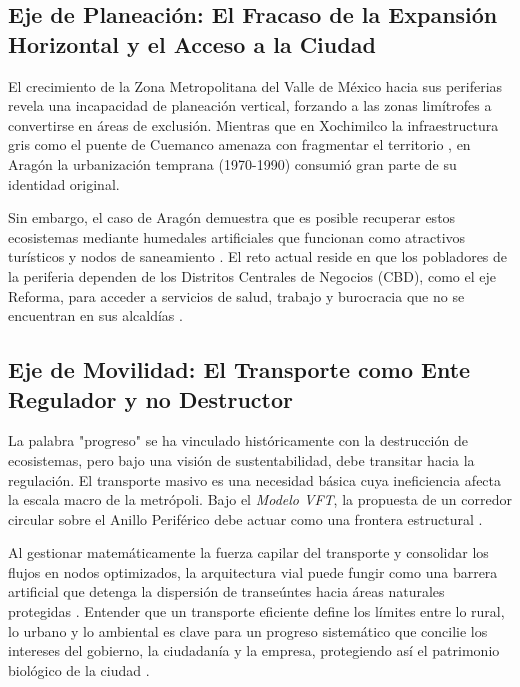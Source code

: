 \subsection{Eje de Planeación: El Fracaso de la Expansión Horizontal y el Acceso a la Ciudad}

El crecimiento de la Zona Metropolitana del Valle de México hacia sus periferias revela una incapacidad de planeación vertical, 
forzando a las zonas limítrofes a convertirse en áreas de exclusión. Mientras que en Xochimilco la infraestructura gris como el puente de 
Cuemanco amenaza con fragmentar el territorio \cite{segob2020proposicion}, en Aragón la urbanización temprana (1970-1990) consumió gran parte de su identidad original. 

Sin embargo, el caso de Aragón demuestra que es posible recuperar estos ecosistemas mediante humedales artificiales que funcionan como atractivos turísticos 
y nodos de saneamiento \cite{unam2020aragon, sedema2022programa}. El reto actual reside en que los pobladores de la periferia dependen de los Distritos Centrales 
de Negocios (CBD), como el eje Reforma, para acceder a servicios de salud, trabajo y burocracia que no se encuentran en sus alcaldías \cite{rojas2020deterioro}.

\subsection{Eje de Movilidad: El Transporte como Ente Regulador y no Destructor}

La palabra "progreso" se ha vinculado históricamente con la destrucción de ecosistemas, pero bajo una visión de sustentabilidad, 
debe transitar hacia la regulación. El transporte masivo es una necesidad básica cuya ineficiencia afecta la escala macro de la metrópoli. 
Bajo el \textit{Modelo VFT}, la propuesta de un corredor circular sobre el Anillo Periférico debe actuar como una frontera estructural \cite{garibaldi2023vft}. 

Al gestionar matemáticamente la fuerza capilar del transporte y consolidar los flujos en nodos optimizados, la arquitectura vial puede fungir como una barrera 
artificial que detenga la dispersión de transeúntes hacia áreas naturales protegidas \cite{garibaldi2023vft}. Entender que un transporte eficiente define los 
límites entre lo rural, lo urbano y lo ambiental es clave para un progreso sistemático que concilie los intereses del gobierno, la ciudadanía y la empresa, 
protegiendo así el patrimonio biológico de la ciudad \cite{garibaldi2023vft, sedema2022programa}.
